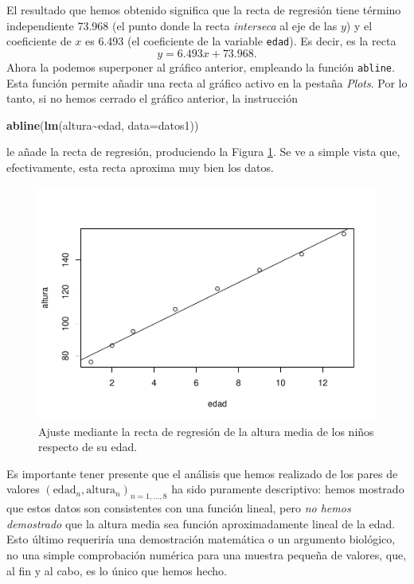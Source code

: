 \documentclass[
]{book}
\newenvironment{Shaded}{\begin{snugshade}}{\end{snugshade}}
\newcommand{\DataTypeTok}[1]{\textcolor[rgb]{0.13,0.29,0.53}{#1}}
\newcommand{\KeywordTok}[1]{\textcolor[rgb]{0.13,0.29,0.53}{\textbf{#1}}}
\newcommand{\NormalTok}[1]{#1}
\newcommand{\OperatorTok}[1]{\textcolor[rgb]{0.81,0.36,0.00}{\textbf{#1}}}
\theoremstyle{definition}
\theoremstyle{definition}
\theoremstyle{definition}
\theoremstyle{remark}
\begin{document}
El resultado que hemos obtenido significa que la recta de regresión tiene término independiente 73.968 (el punto donde la recta \emph{interseca} al eje de las \(y\)) y el coeficiente de \(x\) es 6.493 (el coeficiente de la variable \texttt{edad}). Es decir, es la recta
\[
y=6.493x+73.968.
\]
Ahora la podemos superponer al gráfico anterior, empleando la función \texttt{abline}. Esta función permite añadir una recta al gráfico activo en la pestaña \emph{Plots}. Por lo tanto, si no hemos cerrado el gráfico anterior, la instrucción

\begin{Shaded}
\begin{Highlighting}[]
\KeywordTok{abline}\NormalTok{(}\KeywordTok{lm}\NormalTok{(altura}\OperatorTok{\textasciitilde{}}\NormalTok{edad, }\DataTypeTok{data=}\NormalTok{datos1))}
\end{Highlighting}
\end{Shaded}

le añade la recta de regresión, produciendo la Figura \ref{fig:A302}.
Se ve a simple vista que, efectivamente, esta recta aproxima muy bien los datos.

\begin{figure}

{\centering \includegraphics[width=0.9\linewidth]{03chap02_Un_aperitivo_files/figure-latex/A302-1} 

}

\caption{Ajuste mediante la recta de regresión de la altura media de los niños respecto de su edad.}\label{fig:A302}
\end{figure}

Es importante tener presente que el análisis que hemos realizado de los pares de valores \((\mathrm{edad}_n, \textrm{altura}_n)_{n=1,\ldots,8}\) ha sido puramente descriptivo: hemos mostrado que estos datos son consistentes con una función lineal, pero \emph{no hemos demostrado} que la altura media sea función aproximadamente lineal de la edad. Esto último requeriría una demostración matemática o un argumento biológico, no una simple comprobación numérica para una muestra pequeña de valores, que, al fin y al cabo, es lo único que hemos hecho.
\end{document}
